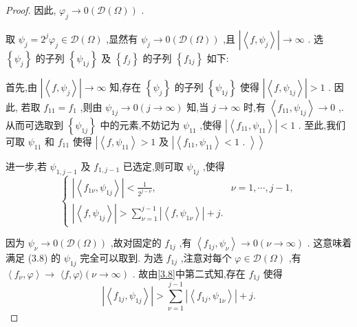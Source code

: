 \documentclass[lang=cn,newtx,10pt,scheme=chinese,thmcnt=chapter]{elegantbook}
\begin{document}
\begin{proof}
因此, \({\varphi }_{j} \rightarrow  0\left( {\mathcal{D}\left( \Omega \right) }\right)\) .

取 \({\psi }_{j} = {2}^{j}{\varphi }_{j} \in  \mathcal{D}\left( \Omega \right)\) ,显然有 \({\psi }_{j} \rightarrow  0\left( {\mathcal{D}\left( \Omega \right) }\right)\) ,且 \(\left| \left\langle  {f,{\psi }_{j}}\right\rangle  \right|  \rightarrow  \infty\) . 选 \(\left\{  {\psi }_{j}\right\}\) 的子列 \(\left\{  {\psi }_{1j}\right\}\) 及 \(\left\{  {f}_{j}\right\}\) 的子列 \(\left\{  {f}_{1j}\right\}\) 如下:

首先,由 \(\left| \left\langle  {f,{\psi }_{j}}\right\rangle  \right|  \rightarrow  \infty\) 知,存在 \(\left\{  {\psi }_{j}\right\}\) 的子列 \(\left\{  {\psi }_{1j}\right\}\) 使得 \(\left| \left\langle  {f,{\psi }_{1j}}\right\rangle  \right|  > 1\) . 因此, 若取 \({f}_{11} = {f}_{1}\) ,则由 \({\psi }_{1j} \rightarrow  0\left( {j \rightarrow  \infty }\right)\) 知,当 \(j \rightarrow  \infty\) 时,有 \(\left\langle  {{f}_{11},{\psi }_{1j}}\right\rangle   \rightarrow  0\) ,. 从而可选取到 \(\left\{  {\psi }_{1j}\right\}\) 中的元素,不妨记为 \({\psi }_{11}\) ,使得 \(\left| \left\langle  {{f}_{11},{\psi }_{11}}\right\rangle  \right|  < 1\) . 至此,我们可取 \({\psi }_{11}\) 和 \({f}_{11}\) 使得 \(\left| {\left\langle  {f,{\psi }_{11}}\right\rangle   > 1\text{ 及 }\left| {\left\langle  {{f}_{11},{\psi }_{11}}\right\rangle   < 1\text{ . }}\right\rangle  }\right\rangle\)

进一步,若 \({\psi }_{1,j - 1}\) 及 \({f}_{1,j - 1}\) 已选定,则可取 \({\psi }_{1j}\) ,使得
\begin{equation}
\left\{  \begin{array}{ll} \left| \left\langle  {{f}_{1\nu },{\psi }_{1j}}\right\rangle  \right|  < \frac{1}{{2}^{j - \nu }}, & \nu  = 1,\cdots ,j - 1, \\  \left| \left\langle  {f,{\psi }_{1j}}\right\rangle  \right|  > \mathop{\sum }\limits_{{\nu  = 1}}^{{j - 1}}\left| \left\langle  {f,{\psi }_{1\nu }}\right\rangle  \right|  + j. &  \end{array}\right.  \label{3.8}
\end{equation}

因为 \({\psi }_{\nu } \rightarrow  0\left( {\mathcal{D}\left( \Omega \right) }\right)\) ,故对固定的 \({f}_{1j}\) ,有 \(\left\langle  {{f}_{1j},{\psi }_{\nu }}\right\rangle   \rightarrow  0\left( {\nu  \rightarrow  \infty }\right)\) . 这意味着满足 (3.8) 的 \({\psi }_{1j}\) 完全可以取到. 为选 \({f}_{1j}\) ,注意对每个 \(\varphi  \in  \mathcal{D}\left( \Omega \right)\) ,有 \(\left\langle  {{f}_{\nu },\varphi }\right\rangle   \rightarrow\)  \(\langle f,\varphi \rangle \left( {\nu  \rightarrow  \infty }\right)\) . 故由\ref{3.8}中第二式知,存在 \({f}_{1j}\) 使得
\begin{equation*}
\left| \left\langle  {{f}_{1j},{\psi }_{1j}}\right\rangle  \right|  > \mathop{\sum }\limits_{{\nu  = 1}}^{{j - 1}}\left| \left\langle  {{f}_{1j},{\psi }_{1\nu }}\right\rangle  \right|  + j.
\end{equation*}


\end{proof}
\end{document}
